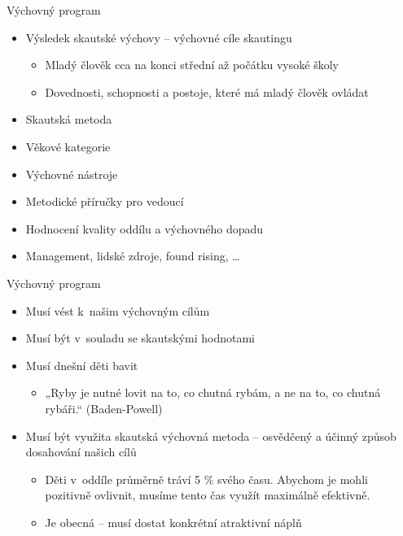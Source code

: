 \documentclass[compress,utf8,xcolor=dvipsnames]{beamer}
\begin{document}
\begin{frame}{Výchovný program}
\begin{itemize}
\item Výsledek skautské výchovy -- výchovné cíle skautingu
 \begin{itemize}
 \item Mladý člověk cca na konci střední až počátku vysoké školy
 \item Dovednosti, schopnosti a postoje, které má mladý člověk ovládat
 \end{itemize}
\item Skautská metoda
\item Věkové kategorie
\item Výchovné nástroje
\item Metodické příručky pro vedoucí
\item Hodnocení kvality oddílu a výchovného dopadu
\item Management, lidské zdroje, found rising, \ldots
\end{itemize}
\end{frame}

\begin{frame}{Výchovný program}
\begin{itemize}
\item Musí vést k~našim výchovným cílům
\item Musí být v~souladu se skautskými hodnotami
\item Musí dnešní děti bavit
 \begin{itemize}
 \item „Ryby je nutné lovit na to, co chutná rybám, a ne na to, co chutná rybáři.“ (Baden-Powell)
 \end{itemize}
\item Musí být využita skautská výchovná metoda -- osvědčený a účinný způsob dosahování našich cílů
 \begin{itemize}
 \item Děti v~oddíle průměrně tráví 5 \% svého času. Abychom je mohli pozitivně ovlivnit, musíme tento čas využít maximálně efektivně.
 \item Je obecná -- musí dostat konkrétní atraktivní náplň
 \end{itemize}
\end{itemize}
\end{frame}
\end{document}
